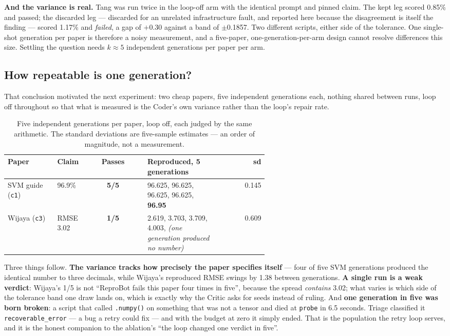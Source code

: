 \documentclass[11pt]{article}
\newcommand{\squeeze}{\setlength{\tabcolsep}{4pt}}
\begin{document}
\textbf{And the variance is real.} Tang was run twice in the loop-off arm with the identical
prompt and pinned claim. The kept leg scored 0.85\% and passed; the discarded leg --- discarded
for an unrelated infrastructure fault, and reported here because the disagreement is itself the
finding --- scored 1.17\% and \emph{failed}, a gap of $+0.30$ against a band of $\pm$0.1857. Two
different scripts, either side of the tolerance. One single-shot generation per paper is
therefore a noisy measurement, and a five-paper, one-generation-per-arm design cannot resolve
differences this size. Settling the question needs $k \approx 5$ independent generations per
paper per arm.

\subsection{How repeatable is one generation?}

That conclusion motivated the next experiment: two cheap papers, five independent generations
each, nothing shared between runs, loop off throughout so that what is measured is the Coder's own
variance rather than the loop's repair rate.

\begin{table}[tbp]
\centering
\small
\caption{Five independent generations per paper, loop off, each judged by the same arithmetic. The
standard deviations are five-sample estimates --- an order of magnitude, not a measurement.}
\label{tab:consistency}
\squeeze
\begin{tabular}{L{0.19\linewidth}L{0.11\linewidth}cL{0.29\linewidth}r}
\toprule
Paper & Claim & Passes & Reproduced, 5 generations & sd \\
\midrule
SVM guide (\texttt{c1}) & 96.9\% & \textbf{5/5} & 96.625, 96.625, 96.625, 96.625, \textbf{96.95} &
  0.145 \\
Wijaya (\texttt{c3}) & RMSE 3.02 & \textbf{1/5} & 2.619, 3.703, 3.709, 4.003, \emph{(one
  generation produced no number)} & 0.609 \\
\bottomrule
\end{tabular}
\end{table}

Three things follow. \textbf{The variance tracks how precisely the paper specifies itself} --- four
of five SVM generations produced the identical number to three decimals, while Wijaya's
reproduced RMSE swings by 1.38 between generations. \textbf{A single run is a weak verdict}:
Wijaya's 1/5 is not ``ReproBot fails this paper four times in five'', because the spread
\emph{contains} 3.02; what varies is which side of the tolerance band one draw lands on, which is
exactly why the Critic asks for seeds instead of ruling. And \textbf{one generation in five was
born broken}: a script that called \texttt{.numpy()} on something that was not a tensor and died
at \texttt{probe} in 6.5 seconds. Triage classified it \texttt{recoverable\_error} --- a bug a
retry could fix --- and with the budget at zero it simply ended. That is the population the retry
loop serves, and it is the honest companion to the ablation's ``the loop changed one verdict in
five''.
\end{document}
